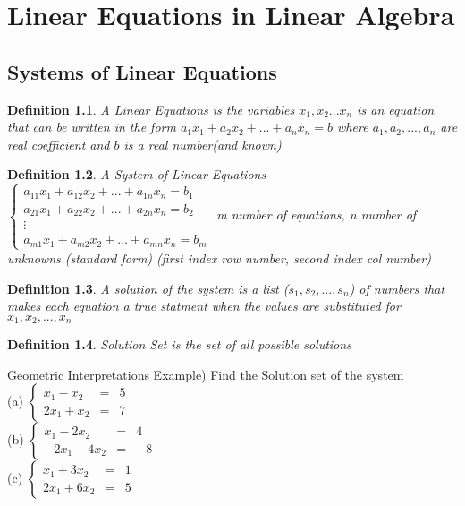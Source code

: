 \documentclass[a4paper,12pt,openany]{book}
\theoremstyle{defn}
\newtheorem{defn}{Definition}[section]
\theoremstyle{expl}
\begin{document}
\tableofcontents 
\chapter{Linear Equations in Linear Algebra}
\section{Systems of Linear Equations}

\begin{defn}\textup{A Linear Equations is the variables $x_1,x_2...x_n$ is an equation that can be written in the form $a_1x_1+a_2x_2+...+a_nx_n = b$ where $a_1,a_2, ..., a_n$ are real coefficient and $b$ is a real number(and known)} \end{defn}
\begin{defn}\textup{A System of Linear Equations
$\left\{ \begin{array}{c}
a_{11}x_1+a_{12}x_2+...+a_{1n}x_n = b_1\\
a_{21}x_1+a_{22}x_2+...+a_{2n}x_n = b_2\\
\vdots\\
a_{m1}x_1+a_{m2}x_2+...+a_{mn}x_n = b_m
\end{array} \right.$ m number of equations, n number of unknowns (standard form) (first index row number, second index col number)}\end{defn}
\begin{defn}\textup{A solution of the system is a list ($s_1,s_2,...,s_n$) of numbers that makes each equation a true statment when the values are substituted for $x_1,x_2,...,x_n$}\end{defn}
\begin{defn}\textup{Solution Set is the set of all possible solutions}\end{defn}

Geometric Interpretations
Example) Find the Solution set of the system \\
(a) $\left\{ \begin{array}{rcl}
x_1 - x_2 & = & 5 \\
2x_1 + x_2 & = & 7
\end{array} \right.$\\
(b) $\left\{ \begin{array}{rcl}
x_1 - 2x_2&=& 4 \\
-2x_1 + 4x_2 &=& -8
\end{array} \right.$\\
(c) $\left\{ \begin{array}{rcl}
x_1+3x_2&=&1\\
2x_1+6x_2&=&5
\end{array} \right.$
\end{document}
